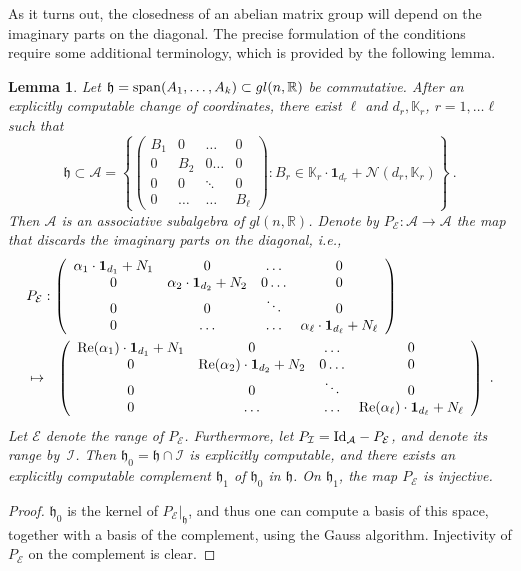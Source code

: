 \documentclass[12pt]{amsart}
\newtheorem{lemma}[thm]{Lemma}
\begin{document}
As it turns out, the closedness of an abelian matrix group will depend on the imaginary parts on the diagonal. The precise formulation of the conditions require some additional terminology, which is provided by
the following lemma.
\begin{lemma} \label{lem:def_h0}
Let $\mathfrak{h}= {{\rm span}}(A_1,\ldots,A_k) \subset gl(n,\mathbb{R})$ be commutative. After an explicitly computable change of coordinates, there exist $\ell$ and $d_r, \mathbb{K}_r$, $r=1,\ldots \ell$  such that
\[
\mathfrak{h} \subset \mathcal{A} = \left\{ \left( \begin{array}{cccc} B_{1} & 0 & \ldots & 0 \\ 0 &  B_{2} & 0
\ldots & 0 \\ 0 & 0 & \ddots & 0 \\ 0 & \ldots & \ldots & B_{\ell} \end{array}
\right) : B_r \in \mathbb{K}_r \cdot \mathbf{1}_{d_r} + \mathcal{N}(d_r,\mathbb{K}_r) \right\}~.
\]
Then $\mathcal{A}$ is an associative subalgebra of $gl(n,\mathbb{R})$.
 Denote by $P_{\mathcal{E}}: \mathcal{A} \to \mathcal{A}$ the map that discards the imaginary parts on the diagonal, i.e.,
\begin{eqnarray*}
\lefteqn{ P_{\mathcal{E}} :  \left( \begin{array}{cccc} \alpha_1 \cdot \mathbf{1}_{d_1} + N_1 & 0 & \ldots & 0 \\ 0 &  \alpha_2 \cdot \mathbf{1}_{d_2} + N_2 & 0
\ldots & 0 \\ 0 & 0 & \ddots & 0 \\ 0 & \ldots & \ldots & \alpha_\ell \cdot \mathbf{1}_{d_\ell} + N_\ell \end{array}
\right) } \\ &  \mapsto &   \left( \begin{array}{cccc} {\rm Re}(\alpha_1) \cdot \mathbf{1}_{d_1} + N_1 & 0 & \ldots & 0 \\ 0 &  {\rm Re} (\alpha_2) \cdot \mathbf{1}_{d_2} + N_2 & 0
\ldots & 0 \\ 0 & 0 & \ddots & 0 \\ 0 & \ldots & \ldots & {\rm Re}(\alpha_\ell) \cdot \mathbf{1}_{d_\ell} + N_\ell \end{array}
\right)  ~.\end{eqnarray*}
Let $\mathcal{E}$ denote the range of $P_{\mathcal{E}}$. Furthermore, let $P_{\mathcal{I}} = {\rm Id}_{\mathcal{A}}-P_{\mathcal{E}}$, and denote its range by~$\mathcal{I}$.
Then $\mathfrak{h}_0 = \mathfrak{h} \cap \mathcal{I}$ is explicitly computable, and there exists an explicitly computable complement $\mathfrak{h}_1$ of $\mathfrak{h}_0$ in $\mathfrak{h}$. On $\mathfrak{h}_1$, the map $P_{\mathcal{E}}$ is injective.
\end{lemma}
\begin{proof}
 $\mathfrak{h}_0$ is the kernel of $P_{\mathcal{E}}|_{\mathfrak{h}}$, and thus one can compute a basis of this space, together with a basis of the complement, using the Gauss algorithm. Injectivity of $P_{\mathcal{E}}$ on the complement is clear.
\end{proof}
\end{document}
